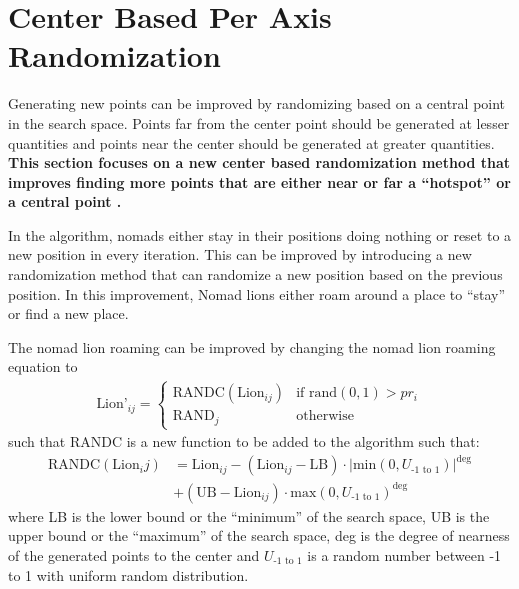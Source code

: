 \section{Center Based Per Axis Randomization}
\par Generating new points can be improved by randomizing based on a central point in the search space. Points far from the center point should be generated at lesser quantities and points near the center should be generated at greater quantities. \textbf{This section focuses on a new center based randomization method that improves finding more points that are either near or far a ``hotspot'' or a central point \cite{strategy}.} 

\par In the algorithm, nomads either stay in their positions doing nothing or reset to a new position in every iteration. This can be improved by introducing a new randomization method that can randomize a new position based on the previous position. In this improvement, Nomad lions either roam around a place to ``stay'' or find a new place.

\par The nomad lion roaming can be improved by changing the nomad lion roaming equation to
\begin{align*}
 \text{Lion'}_{ij} =
  \begin{cases}
   \text{RANDC}(\text{Lion}_{ij})        & \text{if rand}(0,1)  > pr_i \\
   \text{RAND}_j        & \text{otherwise}
 \end{cases}
\end{align*}
such that RANDC is a new function to be added to the algorithm such that:
\begin{align*}
\text{RANDC}(\text{Lion}_ij) &= \text{Lion}_{ij} - (\text{Lion}_{ij} - \text{LB}) \cdot |\text{min}(0, U_\text{-1 to 1})|^\text{deg} \\
 & + (\text{UB} - \text{Lion}_{ij}) \cdot \text{max}(0, U_\text{-1 to 1})^{\text{deg}}
\end{align*}
where LB is the lower bound or the ``minimum'' of the search space, UB is the upper bound or the ``maximum'' of the search space, deg is the degree of nearness of the generated points to the center and $U_\text{-1 to 1}$ is a random number between -1 to 1 with uniform random distribution.


